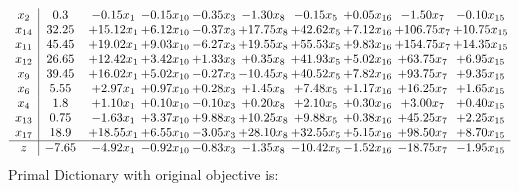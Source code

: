 \documentclass[9pt]{article}
\begin{document}
\[\begin{array}{c| c c@{\hskip 2pt} c@{\hskip 2pt} c@{\hskip 2pt} c@{\hskip 2pt} c@{\hskip 2pt} c@{\hskip 2pt} c@{\hskip 2pt} c@{\hskip 2pt} }
 x_{2}   &  0.3 & -0.15 x_{1} & -0.15 x_{10} & -0.35 x_{3} & -1.30 x_{8} & -0.15 x_{5} & +  0.05 x_{16} & -1.50 x_{7} & -0.10 x_{15}\\
 x_{14}   &  32.25 & + 15.12 x_{1} & +  6.12 x_{10} & -0.37 x_{3} & + 17.75 x_{8} & + 42.62 x_{5} & +  7.12 x_{16} & + 106.75 x_{7} & + 10.75 x_{15}\\
 x_{11}   &  45.45 & + 19.02 x_{1} & +  9.03 x_{10} & -6.27 x_{3} & + 19.55 x_{8} & + 55.53 x_{5} & +  9.83 x_{16} & + 154.75 x_{7} & + 14.35 x_{15}\\
 x_{12}   &  26.65 & + 12.42 x_{1} & +  3.42 x_{10} & +  1.33 x_{3} & +  0.35 x_{8} & + 41.93 x_{5} & +  5.02 x_{16} & + 63.75 x_{7} & +  6.95 x_{15}\\
 x_{9}   &  39.45 & + 16.02 x_{1} & +  5.02 x_{10} & -0.27 x_{3} & -10.45 x_{8} & + 40.52 x_{5} & +  7.82 x_{16} & + 93.75 x_{7} & +  9.35 x_{15}\\
 x_{6}   &  5.55 & +  2.97 x_{1} & +  0.97 x_{10} & +  0.28 x_{3} & +  1.45 x_{8} & +  7.48 x_{5} & +  1.17 x_{16} & + 16.25 x_{7} & +  1.65 x_{15}\\
 x_{4}   &  1.8 & +  1.10 x_{1} & +  0.10 x_{10} & -0.10 x_{3} & +  0.20 x_{8} & +  2.10 x_{5} & +  0.30 x_{16} & +  3.00 x_{7} & +  0.40 x_{15}\\
 x_{13}   &  0.75 & -1.63 x_{1} & +  3.37 x_{10} & +  9.88 x_{3} & + 10.25 x_{8} & +  9.88 x_{5} & +  0.38 x_{16} & + 45.25 x_{7} & +  2.25 x_{15}\\
 x_{17}   &  18.9 & + 18.55 x_{1} & +  6.55 x_{10} & -3.05 x_{3} & + 28.10 x_{8} & + 32.55 x_{5} & +  5.15 x_{16} & + 98.50 x_{7} & +  8.70 x_{15}\\
\hline
z    &  -7.65 & -4.92 x_{1} & -0.92 x_{10} & -0.83 x_{3} & -1.35 x_{8} & -10.42 x_{5} & -1.52 x_{16} & -18.75 x_{7} & -1.95 x_{15}\\
\end{array}\]
Primal Dictionary with original objective is:
\end{document}
